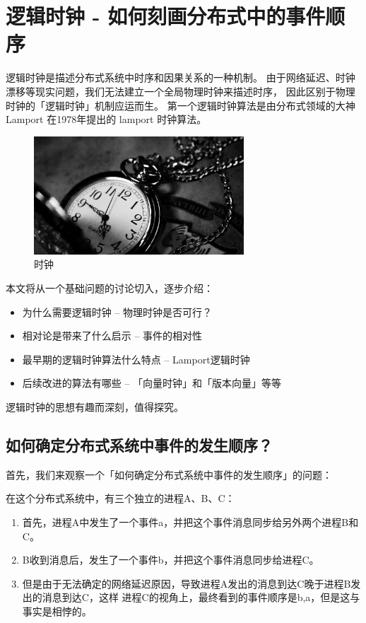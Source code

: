 \documentclass[cn,11pt,chinese]{elegantbook}
\begin{document}
\appendix

\chapter{逻辑时钟 - 如何刻画分布式中的事件顺序}

逻辑时钟是描述分布式系统中时序和因果关系的一种机制。 由于网络延迟、时钟漂移等现实问题，我们无法建立一个全局物理时钟来描述时序， 因此区别于物理时钟的「逻辑时钟」机制应运而生。 第一个逻辑时钟算法是由分布式领域的大神 Lamport 在1978年提出的 lamport 时钟算法。

\begin{figure}[htbp]
    \centering
    \includegraphics[width=0.7\textwidth]{images/repr-clock.jpeg}
    \caption{时钟}
\end{figure}

本文将从一个基础问题的讨论切入，逐步介绍：

\begin{itemize}
    \item 为什么需要逻辑时钟 – 物理时钟是否可行？
    \item 相对论是带来了什么启示 – 事件的相对性
    \item 最早期的逻辑时钟算法什么特点 – Lamport逻辑时钟
    \item 后续改进的算法有哪些 – 「向量时钟」和「版本向量」等等
\end{itemize}

逻辑时钟的思想有趣而深刻，值得探究。

\section{如何确定分布式系统中事件的发生顺序？}

首先，我们来观察一个「如何确定分布式系统中事件的发生顺序」的问题：

在这个分布式系统中，有三个独立的进程A、B、C：

\begin{enumerate}
    \item 首先，进程A中发生了一个事件a，并把这个事件消息同步给另外两个进程B和C。
    \item B收到消息后，发生了一个事件b，并把这个事件消息同步给进程C。
    \item 但是由于无法确定的网络延迟原因，导致进程A发出的消息到达C晚于进程B发出的消息到达C，这样 进程C的视角上，最终看到的事件顺序是b,a，但是这与事实是相悖的。
\end{enumerate}
\end{document}
